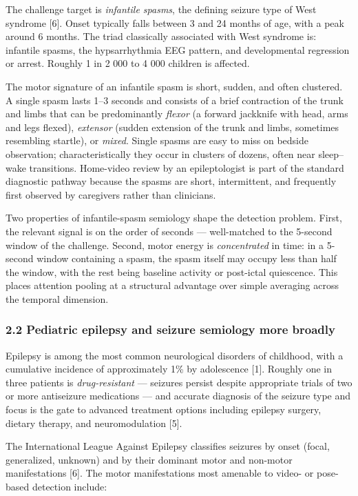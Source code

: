 \documentclass[
  11pt,
]{article}
\begin{document}
The challenge target is \emph{infantile spasms}, the defining seizure
type of West syndrome {[}6{]}. Onset typically falls between 3 and 24
months of age, with a peak around 6 months. The triad classically
associated with West syndrome is: infantile spasms, the hypsarrhythmia
EEG pattern, and developmental regression or arrest. Roughly 1 in 2 000
to 4 000 children is affected.

The motor signature of an infantile spasm is short, sudden, and often
clustered. A single spasm lasts 1--3 seconds and consists of a brief
contraction of the trunk and limbs that can be predominantly
\emph{flexor} (a forward jackknife with head, arms and legs flexed),
\emph{extensor} (sudden extension of the trunk and limbs, sometimes
resembling startle), or \emph{mixed}. Single spasms are easy to miss on
bedside observation; characteristically they occur in clusters of
dozens, often near sleep--wake transitions. Home-video review by an
epileptologist is part of the standard diagnostic pathway because the
spasms are short, intermittent, and frequently first observed by
caregivers rather than clinicians.

Two properties of infantile-spasm semiology shape the detection problem.
First, the relevant signal is on the order of seconds --- well-matched
to the 5-second window of the challenge. Second, motor energy is
\emph{concentrated} in time: in a 5-second window containing a spasm,
the spasm itself may occupy less than half the window, with the rest
being baseline activity or post-ictal quiescence. This places attention
pooling at a structural advantage over simple averaging across the
temporal dimension.

\subsubsection{2.2 Pediatric epilepsy and seizure semiology more
broadly}\label{pediatric-epilepsy-and-seizure-semiology-more-broadly}

Epilepsy is among the most common neurological disorders of childhood,
with a cumulative incidence of approximately 1\% by adolescence {[}1{]}.
Roughly one in three patients is \emph{drug-resistant} --- seizures
persist despite appropriate trials of two or more antiseizure
medications --- and accurate diagnosis of the seizure type and focus is
the gate to advanced treatment options including epilepsy surgery,
dietary therapy, and neuromodulation {[}5{]}.

The International League Against Epilepsy classifies seizures by onset
(focal, generalized, unknown) and by their dominant motor and non-motor
manifestations {[}6{]}. The motor manifestations most amenable to video-
or pose-based detection include:
\end{document}
